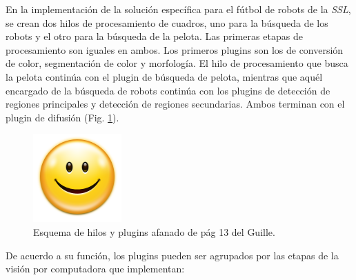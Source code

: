 En la implementación de la solución específica para el fútbol de robots de la
\emph{SSL}, se crean dos hilos de procesamiento de cuadros, uno para la búsqueda
de los robots y el otro para la búsqueda de la pelota. Las primeras etapas de
procesamiento son iguales en ambos. Los primeros plugins son los de conversión
de color, segmentación de color y morfología. El hilo de procesamiento que busca
la pelota continúa con el plugin de búsqueda de pelota, mientras que aquél
encargado de la búsqueda de robots continúa con los plugins de detección de
regiones principales y detección de regiones secundarias. Ambos terminan con el
plugin de difusión (Fig. \ref{FALTA2}).

\begin{figure}[!h]

	\includegraphics[width=\textwidth]{img/FALTA.png}

	\caption{Esquema de hilos y plugins afanado de pág 13 del Guille.}

	\label{FALTA2}

\end{figure}


De acuerdo a su función, los plugins pueden ser agrupados por las etapas de la
visión por computadora que implementan:

